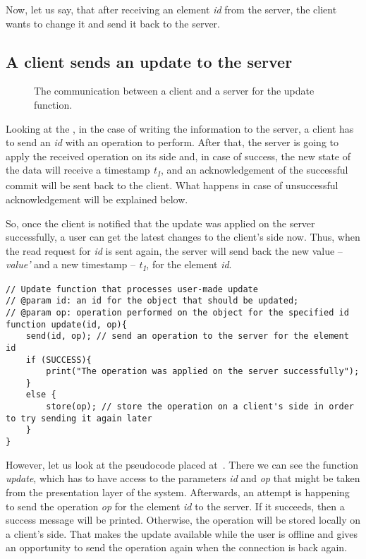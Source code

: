 Now, let us say, that after receiving an element \textit{id} from the server, the client wants to change it and send it back to the server.

\subsection*{A client sends an update to the server}

\begin{figure}[!htb]
    \begin{center}
    \def\svgwidth{\linewidth}
    
    \caption {The communication between a client and a server for the update function.}
    \label{fig:design3}
\end{center}
\end{figure}

Looking at the , in the case of writing the information to the server, a client has to send an \textit{id} with an operation to perform. After that, the server is going to apply the received operation on its side and, in case of success, the new state of the data will receive a timestamp \textit{t\textsubscript{1}}, and an acknowledgement of the successful commit will be sent back to the client. What happens in case of unsuccessful acknowledgement will be explained below. 

So, once the client is notified that the update was applied on the server successfully, a user can get the latest changes to the client's side now. Thus, when the read request for \textit{id} is sent again, the server will send back the new value -- \textit{value'} and a new timestamp -- \textit{t\textsubscript{1}}, for the element \textit{id}.

\begin{lstlisting}[caption={A pseudocode for making a request to change the data.}, label={lst:update1}]
// Update function that processes user-made update
// @param id: an id for the object that should be updated;
// @param op: operation performed on the object for the specified id
function update(id, op){
    send(id, op); // send an operation to the server for the element id
    if (SUCCESS){
        print("The operation was applied on the server successfully"); 
    }
    else {
        store(op); // store the operation on a client's side in order to try sending it again later
    }
}
\end{lstlisting} 

However, let us look at the pseudocode placed at~. There we can see the function \textit{update}, which has to have access to the parameters \textit{id} and \textit{op} that might be taken from the presentation layer of the system. Afterwards, an attempt is happening to send the operation \textit{op} for the element \textit{id} to the server. If it succeeds, then a success message will be printed. Otherwise, the operation will be stored locally on a client's side. That makes the update available while the user is offline and gives an opportunity to send the operation again when the connection is back again.

